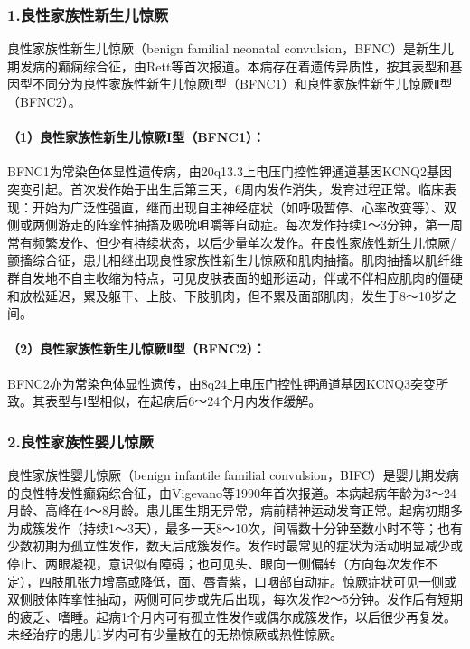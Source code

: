 \subsubsection{1.良性家族性新生儿惊厥}

良性家族性新生儿惊厥（benign familial neonatal
convulsion，BFNC）是新生儿期发病的癫痫综合征，由Rett等首次报道。本病存在着遗传异质性，按其表型和基因型不同分为良性家族性新生儿惊厥I型（BFNC1）和良性家族性新生儿惊厥Ⅱ型（BFNC2）。

\paragraph{（1）良性家族性新生儿惊厥I型（BFNC1）：}

BFNC1为常染色体显性遗传病，由20q13.3上电压门控性钾通道基因KCNQ2基因突变引起。首次发作始于出生后第三天，6周内发作消失，发育过程正常。临床表现：开始为广泛性强直，继而出现自主神经症状（如呼吸暂停、心率改变等）、双侧或两侧游走的阵挛性抽搐及吸吮咀嚼等自动症。每次发作持续1～3分钟，第一周常有频繁发作、但少有持续状态，以后少量单次发作。在良性家族性新生儿惊厥/颤搐综合征，患儿相继出现良性家族性新生儿惊厥和肌肉抽搐。肌肉抽搐以肌纤维群自发地不自主收缩为特点，可见皮肤表面的蛆形运动，伴或不伴相应肌肉的僵硬和放松延迟，累及躯干、上肢、下肢肌肉，但不累及面部肌肉，发生于8～10岁之间。

\paragraph{（2）良性家族性新生儿惊厥Ⅱ型（BFNC2）：}

BFNC2亦为常染色体显性遗传，由8q24上电压门控性钾通道基因KCNQ3突变所致。其表型与Ⅰ型相似，在起病后6～24个月内发作缓解。

\subsubsection{2.良性家族性婴儿惊厥}

良性家族性婴儿惊厥（benign infantile familial
convulsion，BIFC）是婴儿期发病的良性特发性癫痫综合征，由Vigevano等1990年首次报道。本病起病年龄为3～24月龄、高峰在4～8月龄。患儿围生期无异常，病前精神运动发育正常。起病初期多为成簇发作（持续1～3天），最多一天8～10次，间隔数十分钟至数小时不等；也有少数初期为孤立性发作，数天后成簇发作。发作时最常见的症状为活动明显减少或停止、两眼凝视，意识似有障碍；也可见头、眼向一侧偏转（方向每次发作不定），四肢肌张力增高或降低，面、唇青紫，口咽部自动症。惊厥症状可见一侧或双侧肢体阵挛性抽动，两侧可同步或先后出现，每次发作2～5分钟。发作后有短期的疲乏、嗜睡。起病1个月内可有孤立性发作或偶尔成簇发作，以后很少再复发。未经治疗的患儿1岁内可有少量散在的无热惊厥或热性惊厥。

